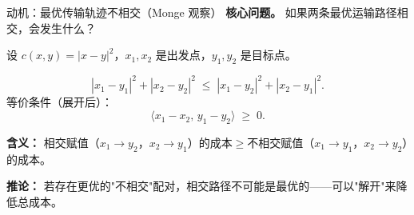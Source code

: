 
\begin{frame}{动机：最优传输轨迹不相交（Monge 观察）}
  \textbf{核心问题。} 如果两条最优运输路径相交，会发生什么？

  设 $c(x,y)=|x-y|^{2}$，$x_{1},x_{2}$ 是出发点，$y_{1},y_{2}$ 是目标点。

  \[
    |x_{1}-y_{1}|^{2}+|x_{2}-y_{2}|^{2} \;\le\; |x_{1}-y_{2}|^{2}+|x_{2}-y_{1}|^{2}.
  \]
  等价条件（展开后）：
  \[
    \langle x_{1}-x_{2},\,y_{1}-y_{2}\rangle \;\ge\; 0.
  \]

  \textbf{含义：} 相交赋值（$x_{1}\to y_{2}$，$x_{2}\to y_{1}$）的成本$\ge$不相交赋值（$x_{1}\to y_{1}$，$x_{2}\to y_{2}$）的成本。

  \textbf{推论：} 若存在更优的"不相交"配对，相交路径不可能是最优的——可以"解开"来降低总成本。

\end{frame}

